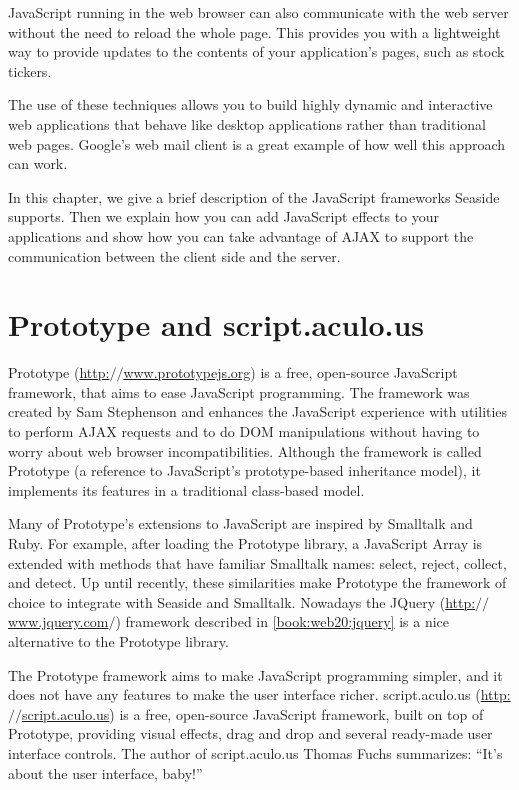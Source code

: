 \documentclass[a4paper,10pt,twoside]{book}
\newcommand{\ct}[1]{{\small\ttfamily\textup{#1}}}
\begin{document}
JavaScript running in the web browser can also communicate with the web server without the need to reload the whole page. This provides you with a lightweight way to provide updates to the contents of your application's pages, such as stock tickers.

The use of these techniques allows you to build highly dynamic and interactive web applications that behave like desktop applications rather than traditional web pages. Google's web mail client is a great example of how well this approach can work.

In this chapter, we give a brief description of the JavaScript frameworks Seaside supports. Then we explain how you can add JavaScript effects to your applications and show how you can take advantage of AJAX to support the communication between the client side and the server.

\section{Prototype and script.aculo.us}
\label{book:web20:scriptaculous:frameworks}

 Prototype (\href{http://www.prototypejs.org}{http:$/$$/$www.prototypejs.org}) is a free, open-source JavaScript framework, that aims to ease JavaScript programming. The framework was created by Sam Stephenson and enhances the JavaScript experience with utilities to perform AJAX requests and to do DOM manipulations without having to worry about web browser incompatibilities. Although the framework is called Prototype (a reference to JavaScript's prototype-based inheritance model), it implements its features in a traditional class-based model.

Many of Prototype's extensions to JavaScript are inspired by Smalltalk and Ruby. For example, after loading the Prototype library, a JavaScript Array is extended with methods that have familiar Smalltalk names: \ct{select}, \ct{reject}, \ct{collect}, and \ct{detect}. Up until recently, these similarities make Prototype the framework of choice to integrate with Seaside and Smalltalk. Nowadays the JQuery (\href{http://www.jquery.com/}{http:$/$$/$www.jquery.com$/$}) framework described in \autoref{book:web20:jquery} is a nice alternative to the Prototype library.

 The Prototype framework aims to make JavaScript programming simpler, and it does not have any features to make the user interface richer. script.aculo.us (\href{http://script.aculo.us}{http:$/$$/$script.aculo.us}) is a free, open-source JavaScript framework, built on top of Prototype, providing visual effects, drag and drop and several ready-made user interface controls. The author of script.aculo.us Thomas Fuchs summarizes: ``It's about the user interface, baby!''
\end{document}
